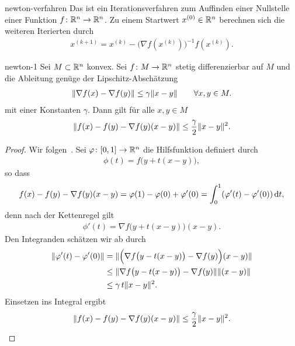 \begin{Definition}{newton-verfahren}
  Das  ist ein Iterationsverfahren zum
  Auffinden einer Nullstelle einer Funktion $f\colon \mathbb R^n\to \mathbb R^n$. Zu
  einem Startwert $x^{(0)} \in \mathbb R^n$ berechnen sich die weiteren
  Iterierten durch
  \begin{gather}
    \label{eq:newton:1}
    x^{(k+1)} = x^{(k)} - \bigl(\nabla f(x^{(k)})\bigr)^{-1} f(x^{(k)}).
  \end{gather}
\end{Definition}

\begin{Lemma}{newton-1}
  Sei $M\subset \mathbb R^n$ konvex. Sei $f\colon M\to \mathbb R^n$ stetig differenzierbar auf $M$ und die Ableitung genüge der Lipschitz-Abschätzung
  \begin{gather}
    \lVert\nabla f(x) - \nabla f(y)\rVert \le \gamma \lVert x-y\rVert
    \qquad \forall x,y\in M.
  \end{gather}
  mit einer Konstanten $\gamma$. Dann gilt für alle $x,y\in M$
  \begin{gather}
    \lVert f(x)-f(y) - \nabla f(y)(x-y)\rVert
    \le \frac\gamma2 \lVert x-y\rVert^2.
  \end{gather}
\end{Lemma}

\begin{proof}
  Wir folgen~\cite[Hilfssatz 5.3.1]{Stoer83}.
  Sei $\varphi\colon[0,1] \to \mathbb R^n$ die Hilfsfunktion definiert durch
  \begin{gather}
    \phi(t) = f\bigl(y+t(x-y)\bigr),
  \end{gather}
  so dass
  \begin{gather}
    f(x)-f(y) - \nabla f(y)(x-y) = \varphi(1) - \varphi(0) + \varphi'(0)
    = \int_0^1 (\varphi'(t)-\varphi'(0))\,\mathrm{d} t,
  \end{gather}
  denn nach der Kettenregel gilt
  \begin{gather}
    \phi'(t) = \nabla f\bigl(y+t(x-y)\bigr)(x-y).
  \end{gather}
  Den Integranden schätzen wir ab durch
  \begin{align}
    \lVert\varphi'(t)-\varphi'(0)\rVert
    & = \lVert\Bigl(\nabla f\bigl(y-t(x-y)\bigr) - \nabla f(y)\Bigr)(x-y)\rVert
    \\
    & \le \lVert\nabla f\bigl(y-t(x-y)\bigr) - \nabla f(y)\rVert\lVert(x-y)\rVert
    \\
    & \le \gamma\,t\lVert x-y\rVert^2.
  \end{align}
  Einsetzen ins Integral ergibt
  \begin{gather}
    \lVert f(x)-f(y) - \nabla f(y)(x-y)\rVert
    \le \frac\gamma2 \lVert x-y\rVert^2.
  \end{gather}
\end{proof}

